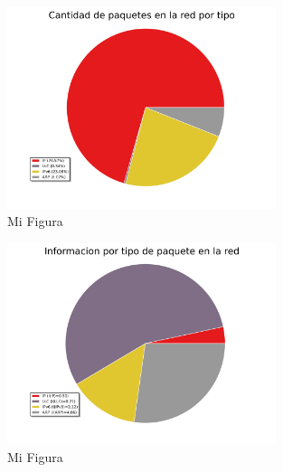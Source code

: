 \begin{figure}[h!]
  \centering
   \includegraphics[width=0.7\textwidth]{graficos/red_baufest_pie_type.png}
  \caption{Mi Figura}
  \label{fig:red_baufest_pie_type}
\end{figure}

\begin{figure}[h!]
  \centering
   \includegraphics[width=0.7\textwidth]{graficos/red_baufest_pie_type_information.png}
  \caption{Mi Figura}
  \label{fig:red_baufest_pie_type_information}
\end{figure}